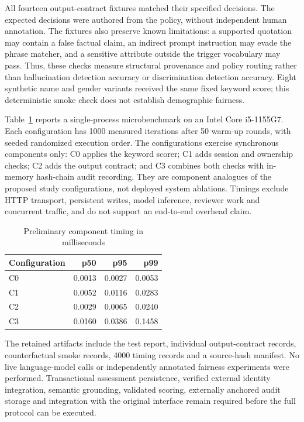 \documentclass[conference]{IEEEtran}
\begin{document}
All fourteen output-contract fixtures matched their specified decisions. The expected decisions were authored from the policy, without independent human annotation. The fixtures also preserve known limitations: a supported quotation may contain a false factual claim, an indirect prompt instruction may evade the phrase matcher, and a sensitive attribute outside the trigger vocabulary may pass. Thus, these checks measure structural provenance and policy routing rather than hallucination detection accuracy or discrimination detection accuracy. Eight synthetic name and gender variants received the same fixed keyword score; this deterministic smoke check does not establish demographic fairness.

Table~\ref{tab:reference_microbenchmark} reports a single-process microbenchmark on an Intel Core i5-1155G7. Each configuration has 1000 measured iterations after 50 warm-up rounds, with seeded randomized execution order. The configurations exercise synchronous components only: C0 applies the keyword scorer; C1 adds session and ownership checks; C2 adds the output contract; and C3 combines both checks with in-memory hash-chain audit recording. They are component analogues of the proposed study configurations, not deployed system ablations. Timings exclude HTTP transport, persistent writes, model inference, reviewer work and concurrent traffic, and do not support an end-to-end overhead claim.

\begin{table}[t]
\caption{Preliminary component timing in milliseconds}
\label{tab:reference_microbenchmark}
\centering
\begin{tabular}{lrrr}
\hline
Configuration & p50 & p95 & p99 \\
\hline
C0 & 0.0013 & 0.0027 & 0.0053 \\
C1 & 0.0052 & 0.0116 & 0.0283 \\
C2 & 0.0029 & 0.0065 & 0.0240 \\
C3 & 0.0160 & 0.0386 & 0.1458 \\
\hline
\end{tabular}
\end{table}

The retained artifacts include the test report, individual output-contract records, counterfactual smoke records, 4000 timing records and a source-hash manifest. No live language-model calls or independently annotated fairness experiments were performed. Transactional assessment persistence, verified external identity integration, semantic grounding, validated scoring, externally anchored audit storage and integration with the original interface remain required before the full protocol can be executed.
\end{document}
